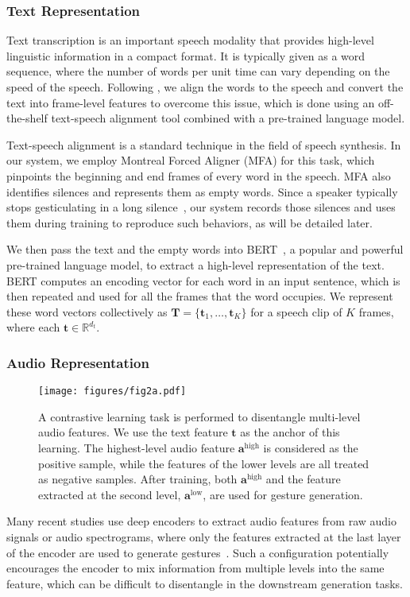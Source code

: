 \documentclass[acmtog,authorversion]{acmart}
\newcommand{\vect}[1]{\bm{#1}}
\newcommand{\eqword}[1]{{\text{#1}}}
\begin{document}
\subsubsection{Text Representation}
Text transcription is an important speech modality that provides high-level linguistic information in a compact format. It is typically given as a word sequence, where the number of words per unit time can vary depending on the speed of the speech. Following \cite{kucherenko2020gesticulator}, we align the words to the speech and convert the text into frame-level features to overcome this issue, which is done using an off-the-shelf text-speech alignment tool combined with a pre-trained language model.

Text-speech alignment is a standard technique in the field of speech synthesis. In our system, we employ Montreal Forced Aligner (MFA) \cite{mcauliffe2017montreal} for this task, which pinpoints the beginning and end frames of every word in the speech. MFA also identifies silences and represents them as empty words. Since a speaker typically stops gesticulating in a long silence~\cite{graziano2018silence}, our system records those silences and uses them during training to reproduce such behaviors, as will be detailed later.

We then pass the text and the empty words into BERT~\cite{devlin2019bert}, a popular and powerful pre-trained language model, to extract a high-level representation of the text. BERT computes an encoding vector for each word in an input sentence, which is then repeated and used for all the frames that the word occupies. We represent these word vectors collectively as $\vect{T}=\{\vect{t}_1,\dots,\vect{t}_K\}$ for a speech clip of $K$ frames, where each $\vect{t}\in\mathbb{R}^{d_t}$.

\subsubsection{Audio Representation}
\label{subsubsec:audio_representation}
\begin{figure}[t]
    \centering
    \texttt{[image: figures/fig2a.pdf]}
    \caption{A contrastive learning task is performed to disentangle multi-level audio features. We use the text feature $\vect{t}$ as the anchor of this learning. The highest-level audio feature $\vect{a}^{\eqword{high}}$ is considered as the positive sample, while the features of the lower levels are all treated as negative samples. After training, both $\vect{a}^{\eqword{high}}$ and the feature extracted at the second level, $\vect{a}^{\eqword{low}}$, are used for gesture generation.}
    \Description{}
    \label{fig:audio_feature_extraction}
\end{figure}
Many recent studies use deep encoders to extract audio features from raw audio signals or audio spectrograms, where only the features extracted at the last layer of the encoder are used to generate gestures~\cite{yoon2020speech,alexanderson2020style,kucherenko2020gesticulator,qian2021speech,li2021audio2gestures}. Such a configuration potentially encourages the encoder to mix information from multiple levels into the same feature, which can be difficult to disentangle in the downstream generation tasks.
\end{document}
